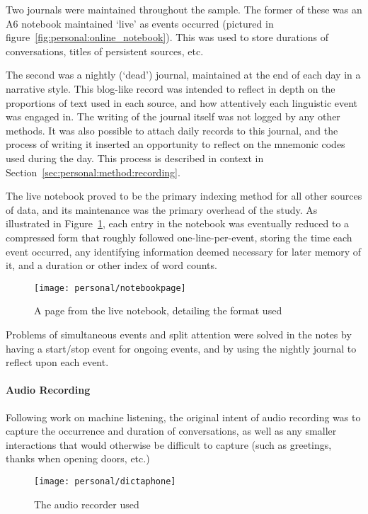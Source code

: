 Two journals were maintained throughout the sample.  The former of these was an A6 notebook maintained `live' as events occurred (pictured in figure~\ref{fig:personal:online_notebook}).  This was used to store durations of conversations, titles of persistent sources, etc.

The second was a nightly (`dead') journal, maintained at the end of each day in a narrative style.  This blog-like record was intended to reflect in depth on the proportions of text used in each source, and how attentively each linguistic event was engaged in.  The writing of the journal itself was not logged by any other methods.  It was also possible to attach daily records to this journal, and the process of writing it inserted an opportunity to reflect on the mnemonic codes used during the day.  This process is described in context in Section~\ref{sec:personal:method:recording}.

The live notebook proved to be the primary indexing method for all other sources of data, and its maintenance was the primary overhead of the study.  As illustrated in Figure~\ref{fig:personal:notebookformat}, each entry in the notebook was eventually reduced to a compressed form that roughly followed one-line-per-event, storing the time each event occurred, any identifying information deemed necessary for later memory of it, and a duration or other index of word counts.

\begin{figure}[p]
    \centering
    \texttt{[image: personal/notebookpage]}
    \caption{A page from the live notebook, detailing the format used}
    \label{fig:personal:notebookformat}
\end{figure}


Problems of simultaneous events and split attention were solved in the notes by having a start/stop event for ongoing events, and by using the nightly journal to reflect upon each event.

\paragraph{Audio Recording}
Following work on machine listening, the original intent of audio recording was to capture the occurrence and duration of conversations, as well as any smaller interactions that would otherwise be difficult to capture (such as greetings, thanks when opening doors, etc.)


\begin{figure}[p]
    \centering
    \texttt{[image: personal/dictaphone]}
    \caption{The audio recorder used}
    \label{fig:personal:audiorecorder}
\end{figure}



